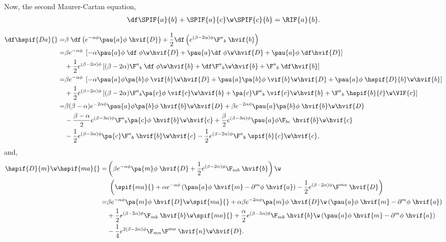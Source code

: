 Now, the second Maurer-Cartan equation,
\begin{align}
  \df\SPIF{a}{b}+\SPIF{a}{c}\w\SPIF{c}{b}=\RIF{a}{b}.
\end{align}

\begin{align}
  \df\hspif{D a}{} 
  =& \beta\;\df\left( e^{-\alpha\phi}\pau{a}\phi\;\hvif{D}\right) + \frac{1}{2}\df\left(e^{(\beta-2\alpha)\phi}\F^a{}_{b}\;\hvif{b}\right)\nonumber\\
  =& \beta e^{-\alpha\phi}\;\left[-\alpha \pau{a}\phi\;\df\;\phi\w\hvif{D} +\pau{a}\df\;\phi\w\hvif{D} + \pau{a}\phi\;\df\hvif{D}\right]\notag\\
  & + \frac{1}{2}e^{(\beta-2\alpha)\phi}\left[(\beta-2\alpha)\F^a{}_{b}\;\df\;\phi\w\hvif{b} + \df \F^a{}_{b}\w\hvif{b} + \F^a{}_{b}\;\df\hvif{b}\right]\nonumber\\
  =& \beta e^{-\alpha\phi}\;\left[-\alpha \pau{a}\phi\pa{b}\phi\;\vif{b}\w\hvif{D} +\pau{a}\pa{b}\phi\;\vif{b}\w\hvif{D} + \pau{a}\phi\;\hspif{D}{b}\w\hvif{b}\right] \notag\\
  &+ \frac{1}{2}e^{(\beta-2\alpha)\phi}\left[(\beta-2\alpha)\F^a{}_b\pa{c}\phi\;\vif{c}\w\hvif{b} + \pa{c} \F^a{}_b\;\vif{c}\w\hvif{b} + \F^a{}_b\;\hspif{b}{\hat{c}}\w\VIF{c}\right]\nonumber\\
 =& \beta(\beta-\alpha)e^{-2\alpha\phi}\pau{a}\phi\pa{b}\phi\;\hvif{b}\w\hvif{D} + \beta e^{-2\alpha\phi}\pau{a}\pa{b}\phi\;\hvif{b}\w\hvif{D}  \notag\\
 &-\frac{\beta-\alpha}{2}e^{(\beta-3\alpha)\phi}\F^a{}_b\pa{c}\phi\;\hvif{b}\w\hvif{c} +\frac{\beta}{2}e^{(\beta-3\alpha)\phi}\pau{a}\phi \F_{bc}\;\hvif{b}\w\hvif{c}\nonumber\\
 & -\frac{1}{2}e^{(\beta-3\alpha)\phi}\pa{c} \F^a{}_b\;\hvif{b}\w\hvif{c} - \frac{1}{2}e^{(\beta-2\alpha)\phi}\F^a{}_b\; \spif{b}{c}\w\hvif{c},
\end{align}
and,
\begin{align}
  \hspif{D}{m}\w\hspif{m a}{} =& \left(\beta e^{-\alpha\phi}\pa{m}\phi\;\hvif{D} + \frac{1}{2}e^{(\beta-2\alpha)\phi}\F_{m b}\;\hvif{b}  \right)\w\notag\\
  &{}\;\left(\spif{m a}{} + \alpha e^{-\alpha\phi}\left(\pau{a}\phi\;\hvif{m} - \partial^{m}\phi\;\hvif{a}\right) - \frac{1}{2}e^{(\beta-2\alpha)\phi}\F^{m a}\;\hvif{D}  \right)\nonumber\\
 =& \beta e^{-\alpha\phi}\pa{m}\phi\;\hvif{D}\w\spif{m a}{} + \alpha\beta e^{-2\alpha\phi}\pa{m}\phi\;\hvif{D}\w\left(\pau{a}\phi\;\hvif{m} - \partial^{m}\phi\;\hvif{a}\right)\nonumber\\
 & + \frac{1}{2}e^{(\beta-2\alpha)\phi}\F_{m b}\;\hvif{b}\w\spif{m a}{} + \frac{\alpha}{2}e^{(\beta-3\alpha)\phi}\F_{m b}\;\hvif{b}\w\left(\pau{a}\phi\;\hvif{m} - \partial^{m}\phi\;\hvif{a}\right)\nonumber\\
 & -\frac{1}{4}e^{2(\beta-2\alpha)\phi}\F_{m n}\F^{m a}\;\hvif{n}\w\hvif{D}.
\end{align}
